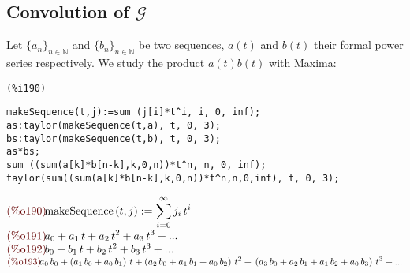 \subsection{Convolution of $\mathcal{G} $}

Let $\{a_n\}_{n\in\mathbb{N} }$ and $\{b_n\}_{n\in\mathbb{N} } $ be
two sequences, $a(t)$ and $b(t)$ their formal power series
respectively. We study the product $a(t)b(t)$ with Maxima:\\
\noindent
\begin{minipage}[t]{8ex}{\color{red}\bf
\begin{verbatim}
(%i190)
\end{verbatim}}
\end{minipage}
\begin{minipage}[t]{\textwidth}{\color{blue}
\begin{verbatim}
makeSequence(t,j):=sum (j[i]*t^i, i, 0, inf);
as:taylor(makeSequence(t,a), t, 0, 3);
bs:taylor(makeSequence(t,b), t, 0, 3);
as*bs;
sum ((sum(a[k]*b[n-k],k,0,n))*t^n, n, 0, inf);
taylor(sum((sum(a[k]*b[n-k],k,0,n))*t^n,n,0,inf), t, 0, 3);
\end{verbatim}}
\end{minipage}
\begin{math}\displaystyle
\parbox{8ex}{\color{labelcolor}(\%o190) }
\mathrm{makeSequence}\left( t,j\right) :=\sum_{i=0}^{\infty }{j}_{i}\,{t}^{i}
\end{math}\\
\begin{math}\displaystyle
\parbox{8ex}{\color{labelcolor}(\%o191) }
{a}_{0}+{a}_{1}\,t+{a}_{2}\,{t}^{2}+{a}_{3}\,{t}^{3}+...
\end{math}\\
\begin{math}\displaystyle
\parbox{8ex}{\color{labelcolor}(\%o192) }
{b}_{0}+{b}_{1}\,t+{b}_{2}\,{t}^{2}+{b}_{3}\,{t}^{3}+...
\end{math}\\
\begin{math}\displaystyle
  \parbox{8ex}{\color{labelcolor}(\%o193) } {a}_{0}\,{b}_{0}+\left(
    {a}_{1}\,{b}_{0}+{a}_{0}\,{b}_{1}\right) \,t+\left(
    {a}_{2}\,{b}_{0}+{a}_{1}\,{b}_{1}+{a}_{0}\,{b}_{2}\right)
  \,{t}^{2}+\\
  \left(
    {a}_{3}\,{b}_{0}+{a}_{2}\,{b}_{1}+{a}_{1}\,{b}_{2}+{a}_{0}\,{b}_{3}\right)
  \,{t}^{3}+...
\end{math}\\

